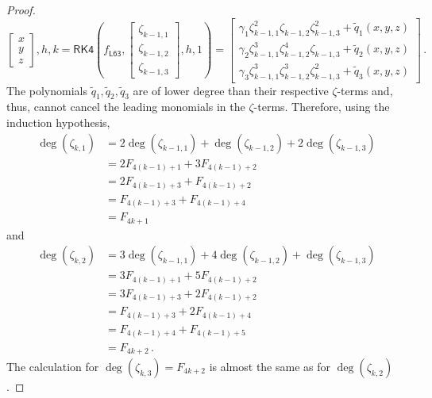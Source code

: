 \documentclass[10pt,a4paper]{amsart}
\newcommand{\br}[1]{\lb #1 \rb} %
\newcommand{\brOf}[1]{\!\br{#1}} %
\newcommand{\eqfs}{\,.}
\newcommand{\lb}{\left(} %
\newcommand{\rb}{\right)} %
\begin{document}
\begin{proof}
\begin{equation*}
{\begin{bmatrix}
				x\\
				y\\
				z
			\end{bmatrix}, h, k} = 
		\mathsf{RK4}\brOf{f_{\mathsf{L63}}, \begin{bmatrix}\zeta_{k-1,1}\\\zeta_{k-1,2}\\\zeta_{k-1,3}\end{bmatrix}, h, 1} = 
		\begin{bmatrix}
			\gamma_1 \zeta_{k-1,1}^2\zeta_{k-1,2}\zeta_{k-1,3}^2 + \tilde q_1(x,y,z)\\
			\gamma_2 \zeta_{k-1,1}^3\zeta_{k-1,2}^4\zeta_{k-1,3} + \tilde q_2(x,y,z)\\
			\gamma_3 \zeta_{k-1,1}^3\zeta_{k-1,2}^3\zeta_{k-1,3}^2 + \tilde q_3(x,y,z)
		\end{bmatrix}
		\eqfs
	\end{equation*}
	The polynomials $\tilde q_1, \tilde q_2, \tilde q_3$ are of lower degree than their respective $\zeta$-terms and, thus, cannot cancel the leading monomials in the $\zeta$-terms.
	Therefore, using the induction hypothesis,
	\begin{align*}
		\deg(\zeta_{k,1}) 
		&= 
		2\deg(\zeta_{k-1,1}) + \deg(\zeta_{k-1,2}) + 2 \deg(\zeta_{k-1,3})
		\\&=
		2  F_{4(k-1)+1} + 3  F_{4(k-1)+2}
		\\&=
		2  F_{4(k-1)+3} +  F_{4(k-1)+2}
		\\&=
		F_{4(k-1)+3} +  F_{4(k-1)+4}
		\\&=
		F_{4k+1}
	\end{align*}
	and
	\begin{align*}
		\deg(\zeta_{k,2}) 
		&= 
		3\deg(\zeta_{k-1,1}) + 4\deg(\zeta_{k-1,2}) +  \deg(\zeta_{k-1,3})
		\\&=
		3  F_{4(k-1)+1} + 5 F_{4(k-1)+2}
		\\&=
		3  F_{4(k-1)+3} + 2 F_{4(k-1)+2}
		\\&=
		F_{4(k-1)+3} + 2 F_{4(k-1)+4}
		\\&=
		F_{4(k-1)+4} + F_{4(k-1)+5}
		\\&=
		F_{4k+2}
		\eqfs
	\end{align*}
	The calculation for $\deg(\zeta_{k,3}) = F_{4k+2}$ is almost the same as for $\deg(\zeta_{k,2})$.
\end{proof}
\end{document}
